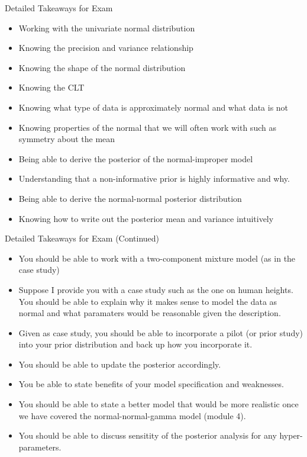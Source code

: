 \documentclass[
  ignorenonframetext,
]{beamer}
\providecommand{\tightlist}{%
  \setlength{\itemsep}{0pt}\setlength{\parskip}{0pt}}
\begin{document}
\begin{frame}{Detailed Takeaways for Exam}
\protect\hypertarget{detailed-takeaways-for-exam}{}
\begin{itemize}
\tightlist
\item
  Working with the univariate normal distribution
\item
  Knowing the precision and variance relationship
\item
  Knowing the shape of the normal distribution
\item
  Knowing the CLT
\item
  Knowing what type of data is approximately normal and what data is not
\item
  Knowing properties of the normal that we will often work with such as
  symmetry about the mean
\item
  Being able to derive the posterior of the normal-improper model
\item
  Understanding that a non-informative prior is highly informative and
  why.
\item
  Being able to derive the normal-normal posterior distribution
\item
  Knowing how to write out the posterior mean and variance intuitively
\end{itemize}
\end{frame}

\begin{frame}{Detailed Takeaways for Exam (Continued)}
\protect\hypertarget{detailed-takeaways-for-exam-continued}{}
\begin{itemize}
\tightlist
\item
  You should be able to work with a two-component mixture model (as in
  the case study)
\item
  Suppose I provide you with a case study such as the one on human
  heights. You should be able to explain why it makes sense to model the
  data as normal and what paramaters would be reasonable given the
  description.
\item
  Given as case study, you should be able to incorporate a pilot (or
  prior study) into your prior distribution and back up how you
  incorporate it.
\item
  You should be able to update the posterior accordingly.
\item
  You be able to state benefits of your model specification and
  weaknesses.
\item
  You should be able to state a better model that would be more
  realistic once we have covered the normal-normal-gamma model (module
  4).
\item
  You should be able to discuss sensitity of the posterior analysis for
  any hyper-parameters.
\end{itemize}
\end{frame}
\end{document}
